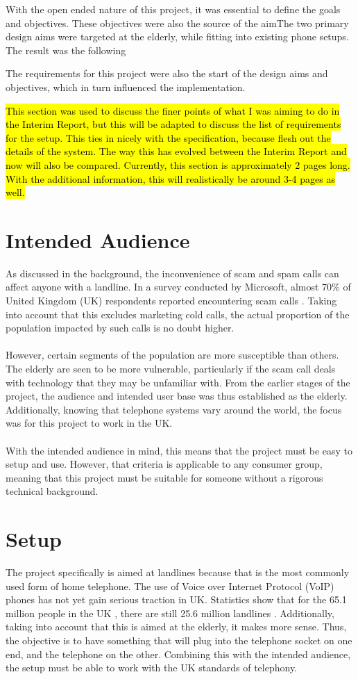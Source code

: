 \documentclass[main.tex]{subfiles}
\begin{document}
With the open ended nature of this project, it was essential to define the goals and objectives. These objectives were also the source of the aimThe two primary design aims were targeted at the elderly, while fitting into existing phone setups. The result was the following

The requirements for this project were also the start of the design aims and objectives, which in turn influenced the implementation.

\hl{This section was used to discuss the finer points of what I was aiming to do in the Interim Report, but this will be adapted to discuss the list of requirements for the setup. This ties in nicely with the specification, because flesh out the details of the system. The way this has evolved between the Interim Report and now will also be compared. Currently, this section is approximately 2 pages long. With the additional information, this will realistically be around 3-4 pages as well. }

\section{Intended Audience}
As discussed in the background, the inconvenience of scam and spam calls can affect anyone with a landline. In a survey conducted by Microsoft, almost 70\% of United Kingdom (UK) respondents reported encountering scam calls \cite{microsoft-survey}. Taking into account that this excludes marketing cold calls, the actual proportion of the population impacted by such calls is no doubt higher.
\\\\
However, certain segments of the population are more susceptible than others. The elderly are seen to be more vulnerable, particularly if the scam call deals with technology that they may be unfamiliar with. From the earlier stages of the project, the audience and intended user base was thus established as the elderly. Additionally, knowing that telephone systems vary around the world, the focus was for this project to work in the UK.
\\\\
With the intended audience in mind, this means that the project must be easy to setup and use. However, that criteria is applicable to any consumer group, meaning that this project must be suitable for someone without a rigorous technical background.

\section{Setup}
The project specifically is aimed at landlines because that is the most commonly used form of home telephone. The use of Voice over Internet Protocol (VoIP) phones has not yet gain serious traction in UK. Statistics show that for the 65.1 million people in the UK \cite{ons}, there are still 25.6 million landlines \cite{ofcom}. Additionally, taking into account that this is aimed at the elderly, it makes more sense. Thus, the objective is to have something that will plug into the telephone socket on one end, and the telephone on the other. Combining this with the intended audience, the setup must be able to work with the UK standards of telephony.
\end{document}
